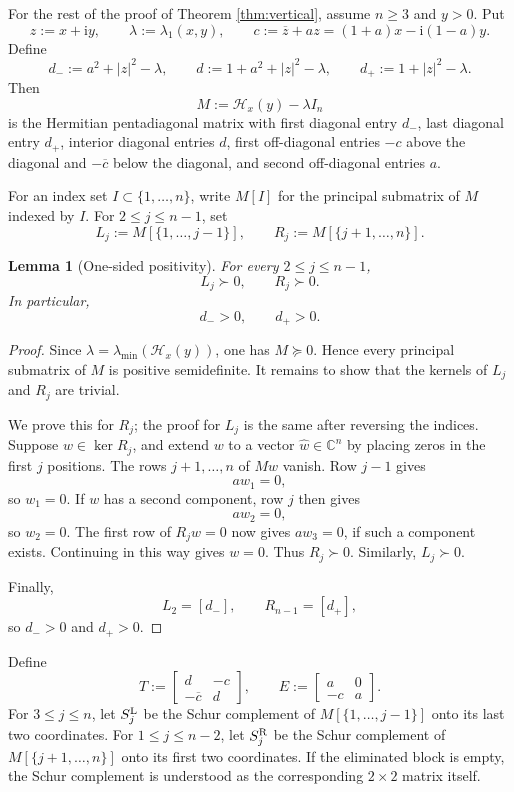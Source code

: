 \documentclass[11pt]{amsart}
\numberwithin{equation}{section}
\newcommand{\C}{\mathbb C}
\newcommand{\ii}{\mathrm i}
\newtheorem{lemma}[theorem]{Lemma}
\begin{document}
For the rest of the proof of Theorem \ref{thm:vertical}, assume \(n\ge3\) and \(y>0\).  Put
\[
z:=x+\ii y,
\qquad
\lambda:=\lambda_1(x,y),
\qquad
c:=\overline z+az=(1+a)x-\ii(1-a)y.
\]
Define
\[
d_-:=a^2+|z|^2-\lambda,
\qquad
d:=1+a^2+|z|^2-\lambda,
\qquad
d_+:=1+|z|^2-\lambda.
\]
Then
\[
M:=\mathcal H_x(y)-\lambda I_n
\]
is the Hermitian pentadiagonal matrix with first diagonal entry \(d_-\), last diagonal entry \(d_+\), interior diagonal entries \(d\), first off-diagonal entries \(-c\) above the diagonal and \(-\overline c\) below the diagonal, and second off-diagonal entries \(a\).

For an index set \(I\subset\{1,\dots,n\}\), write \(M[I]\) for the principal submatrix of \(M\) indexed by \(I\).  For \(2\le j\le n-1\), set
\[
L_j:=M[\{1,\dots,j-1\}],
\qquad
R_j:=M[\{j+1,\dots,n\}].
\]

\begin{lemma}[One-sided positivity]\label{lem:one-sided-positivity}
For every \(2\le j\le n-1\),
\[
L_j\succ0,
\qquad
R_j\succ0.
\]
In particular,
\[
d_->0,
\qquad
d_+>0.
\]
\end{lemma}

\begin{proof}
Since \(\lambda=\lambda_{\min}(\mathcal H_x(y))\), one has \(M\succeq0\).  Hence every principal submatrix of \(M\) is positive semidefinite.  It remains to show that the kernels of \(L_j\) and \(R_j\) are trivial.

We prove this for \(R_j\); the proof for \(L_j\) is the same after reversing the indices.  Suppose \(w\in\ker R_j\), and extend \(w\) to a vector \(\widehat w\in\C^n\) by placing zeros in the first \(j\) positions.  The rows \(j+1,\dots,n\) of \(M\widehat w\) vanish.  Row \(j-1\) gives
\[
aw_1=0,
\]
so \(w_1=0\).  If \(w\) has a second component, row \(j\) then gives
\[
aw_2=0,
\]
so \(w_2=0\).  The first row of \(R_jw=0\) now gives \(aw_3=0\), if such a component exists.  Continuing in this way gives \(w=0\).  Thus \(R_j\succ0\).  Similarly, \(L_j\succ0\).

Finally,
\[
L_2=[d_-],
\qquad
R_{n-1}=[d_+],
\]
so \(d_->0\) and \(d_+>0\).
\end{proof}

Define
\[
T:=
\begin{bmatrix}
d & -c\\
-\overline c & d
\end{bmatrix},
\qquad
E:=
\begin{bmatrix}
a & 0\\
-c & a
\end{bmatrix}.
\]
For \(3\le j\le n\), let \(S_j^{\rm L}\) be the Schur complement of \(M[\{1,\dots,j-1\}]\) onto its last two coordinates.  For \(1\le j\le n-2\), let \(S_j^{\rm R}\) be the Schur complement of \(M[\{j+1,\dots,n\}]\) onto its first two coordinates.  If the eliminated block is empty, the Schur complement is understood as the corresponding \(2\times2\) matrix itself.
\end{document}
